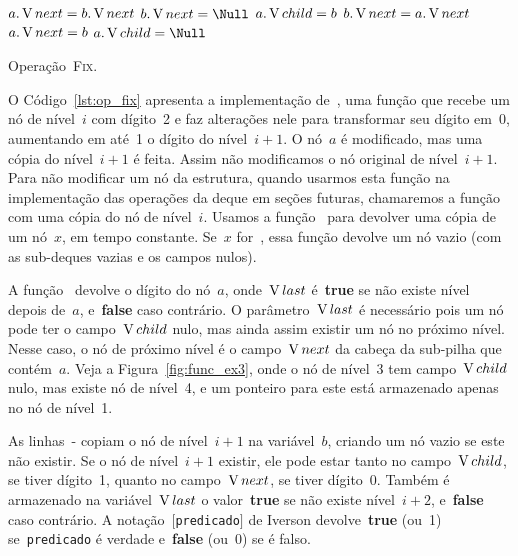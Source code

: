\documentclass[main.tex]{subfiles}
\begin{document}
\begin{algorithm}
\begin{algorithmic}[1]
          \label{line:fix:next_a_bb}
            \State $a.\operatorname{V}{next} = b.\operatorname{V}{next}$
            \State $b.\V{next} = \Null$ \label{line:fix:next_a_be}
        \EndIf
        \State $a.\operatorname{V}{child} = b$ \label{line:fix:child_a_b}
    \Else
         \label{line:fix:next_b_ab}
            \State $b.\operatorname{V}{next} = a.\operatorname{V}{next}$  \label{line:fix:next_b_ae}
        \EndIf
        \State $a.\operatorname{V}{next} = b$ \label{line:fix:child_b_ab}
        \State $a.\V{child} = \Null$  \label{line:fix:child_b_ae}
    \EndIf
\EndFunction

\end{algorithmic}
\caption{Operação~\textsc{Fix}.} \label{lst:op_fix}
\end{algorithm}

O Código~\ref{lst:op_fix} apresenta a implementação de~, uma função que recebe um nó de nível~$i$ com dígito~2 e faz alterações nele para transformar seu dígito em~0, aumentando em até~1 o dígito do nível~$i+1$. O nó~$a$ é modificado, mas uma cópia do nível~$i+1$ é feita. Assim não modificamos o nó original de nível~$i+1$. Para não modificar um nó da estrutura, quando usarmos esta função na implementação das operações da deque em seções futuras, chamaremos a função com uma cópia do nó de nível~$i$. Usamos a função~ para devolver uma cópia de um nó~$x$, em tempo constante. Se~$x$ for~, essa função devolve um nó vazio (com as sub-deques vazias e os campos nulos).

A função~ devolve o dígito do nó~$a$, onde~$\operatorname{V}{last}$ é~\textbf{true} se não existe nível depois de~$a$, e~\textbf{false} caso contrário. O parâmetro~$\operatorname{V}{last}$ é necessário pois um nó pode ter o campo~$\operatorname{V}{child}$ nulo, mas ainda assim existir um nó no próximo nível. Nesse caso, o nó de próximo nível é o campo~$\operatorname{V}{next}$ da cabeça da sub-pilha que contém~$a$. Veja a Figura~\ref{fig:func_ex3}, onde o nó de nível~3 tem campo~$\operatorname{V}{child}$ nulo, mas existe nó de nível~4, e um ponteiro para este está armazenado apenas no nó de nível~1.

As linhas~{-} copiam o nó de nível~$i+1$ na variável~$b$, criando um nó vazio se este não existir. Se o nó de nível~${i+1}$ existir, ele pode estar tanto no campo~$\operatorname{V}{child}$, se tiver dígito~1, quanto no campo~$\operatorname{V}{next}$, se tiver dígito~0.
Também é armazenado na variável~$\operatorname{V}{last}$ o valor~\textbf{true} se não existe nível~$i+2$, e~\textbf{false} caso contrário. A notação~$[$\texttt{predicado}$]$ de Iverson devolve~\textbf{true} (ou~1) se~\texttt{predicado} é verdade e~\textbf{false} (ou~0) se é falso.
\end{document}
